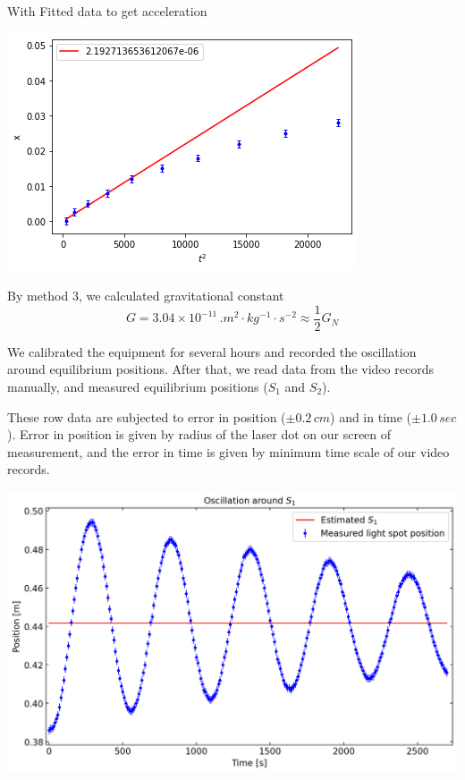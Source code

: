 \documentclass[a4paper]{tufte-handout}
\begin{document}
With  Fitted data to get acceleration

\includegraphics[scale=0.65]{figures/fit_feb8.png}

By method 3, we calculated gravitational constant
$$G=3.04\times 10^{-11} \,\si{.m^2\cdot kg^{-1}\cdot s^{-2}}\approx \frac{1}{2}G_{\si{N}}$$

\hrulefill

We calibrated the equipment for several hours and recorded the oscillation around equilibrium positions. After that, we read data from the video records manually, and measured equilibrium positions ($S_1$ and $S_2$). 

These row data are subjected to error in position ($\pm 0.2\, \si{cm}$) and in time ($\pm 1.0 \, \si{sec}$). Error in position is given by radius of the laser dot on our screen of measurement, and the error in time is given by minimum time scale of our video records.

\includegraphics[width= 1 \linewidth]{figures/eq_s1.png}
\end{document}
